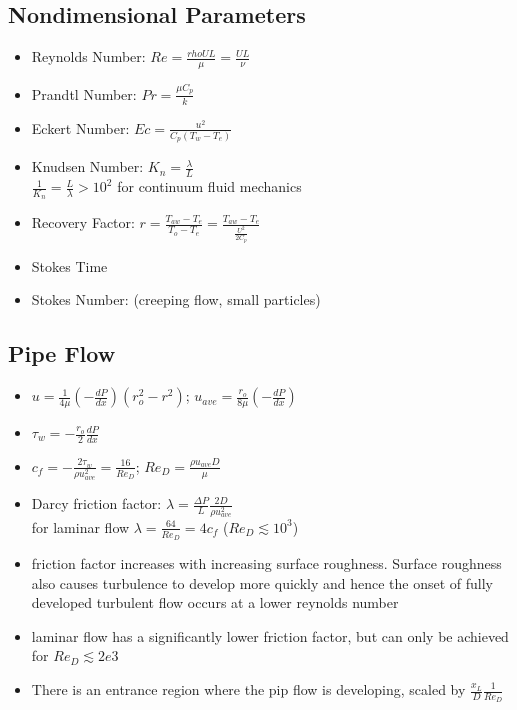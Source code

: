 \documentclass[a4paper]{article}
\begin{document}
    \subsection{Nondimensional Parameters}
    \begin{itemize}
        \item Reynolds Number: $Re = \frac{rho U L}{\mu} = \frac{U L}{\nu}$
        \item Prandtl Number: $Pr = \frac{\mu C_p}{k}$
        \item Eckert Number: $Ec = \frac{u^2}{C_p(T_w - T_e)}$
        \item Knudsen Number: $K_n = \frac{\lambda}{L}$ \\
        $\frac{1}{K_n} = \frac{L}{\lambda} > 10^2$ for continuum fluid mechanics
        \item Recovery Factor: $r = \frac{T_{aw} - T_e}{T_o - T_e} = \frac{T_{aw} - T_e}{\frac{U^2}{2 C_p}}$
        \item Stokes Time
        \item Stokes Number: (creeping flow, small particles)
    \end{itemize}

    \subsection{Pipe Flow}
    \begin{itemize}
        \item $u = \frac{1}{4 \mu} \left( -\frac{dP}{dx} \right) \left( r_o^2 - r^2 \right)$; %
        $u_{ave} = \frac{r_o}{8 \mu}\left( -\frac{dP}{dx} \right)$
        \item $\tau_w = - \frac{r_o}{2}\frac{dP}{dx}$
        \item $c_f = -\frac{2 \tau_w}{\rho u_{ave}^2} = \frac{16}{Re_{D}}$; $Re_D = \frac{\rho u_{ave} D}{\mu}$
        \item Darcy friction factor: $\lambda = \frac{\Delta P}{L}\frac{2D}{\rho u_{ave}^2}$ \\
        for laminar flow $\lambda = \frac{64}{Re_D} = 4 c_f$ ($Re_D \lesssim 10^3$)
        \item friction factor increases with increasing surface roughness. Surface roughness also causes turbulence to develop more quickly and hence the onset of fully developed turbulent flow occurs at a lower reynolds number
        \item laminar flow has a significantly lower friction factor, but can only be achieved for $Re_D \lesssim 2e3 $
        \item There is an entrance region where the pip flow is developing, scaled by $\frac{x_L}{D}\frac{1}{Re_D}$
    \end{itemize}
\end{document}
